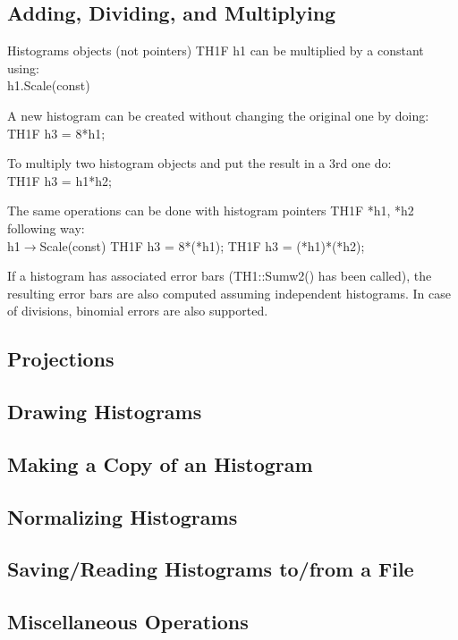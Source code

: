 \documentclass[12pt,a4paper]{article}
\begin{document}
\subsection{Adding, Dividing, and Multiplying}
Histograms objects (not pointers) TH1F h1 can be multiplied by a constant using: \\
h1.Scale(const)

A new histogram can be created without changing the original one by doing: \\
TH1F h3 = 8*h1;

To multiply two histogram objects and put the result in a 3rd one do: \\
TH1F h3 = h1*h2;

The same operations can be done with histogram pointers TH1F *h1, *h2 following way: \\
h1$\rightarrow$Scale(const) TH1F h3 = 8*(*h1); TH1F h3 = (*h1)*(*h2);

If a histogram has associated error bars (TH1::Sumw2() has been called), the resulting error bars are also computed assuming independent histograms. In case of divisions, binomial errors are also supported.






\subsection{Projections}



\subsection{Drawing Histograms}


\subsection{Making a Copy of an Histogram}

\subsection{Normalizing Histograms}


\subsection{Saving/Reading Histograms to/from a File}

\subsection{Miscellaneous Operations}
\end{document}
